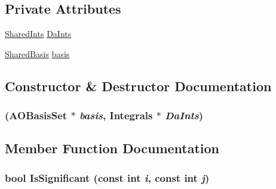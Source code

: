 \subsection*{Private Attributes}
\begin{DoxyCompactItemize}
\item 
\hyperlink{namespaceJKBuilder_a5f21cc1a0cc795f1cb9aceca0400dcd0}{SharedInts} \hyperlink{classJKBuilder_1_1PsiShared_abff505bf91f526e978bc6abbf3e0cfc5}{DaInts}
\item 
\hyperlink{namespaceJKBuilder_aa50d645c83645be7de5fa94937abf1f3}{SharedBasis} \hyperlink{classJKBuilder_1_1PsiShared_a33250ff04c740919f41b0ffb6c78ada5}{basis}
\end{DoxyCompactItemize}


\subsection{Constructor \& Destructor Documentation}
\hypertarget{classJKBuilder_1_1PsiShared_a6500ac4c346e1a9c8c27f8b9f02bb29b}{
\subsubsection[{PsiShared}]{ ({\bf AOBasisSet} $\ast$ {\em basis}, \/  {\bf Integrals} $\ast$ {\em DaInts})}}
\label{classJKBuilder_1_1PsiShared_a6500ac4c346e1a9c8c27f8b9f02bb29b}


\subsection{Member Function Documentation}
\hypertarget{classJKBuilder_1_1PsiShared_a911b43dc1d1da86bfdbd45e86f4be122}{
\subsubsection[{IsSignificant}]{\setlength{\rightskip}{0pt plus 5cm}bool IsSignificant (const int {\em i}, \/  const int {\em j})}}
\label{classJKBuilder_1_1PsiShared_a911b43dc1d1da86bfdbd45e86f4be122}



